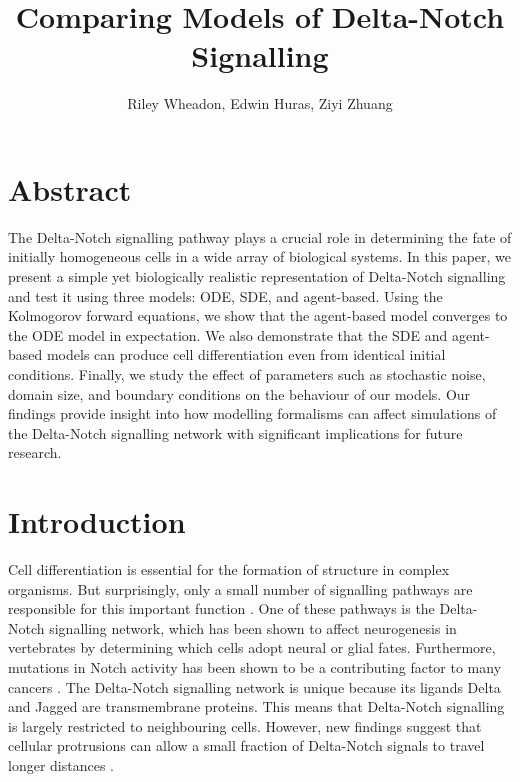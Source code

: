 \documentclass{article}
\title{Comparing Models of Delta-Notch Signalling}
\author{Riley Wheadon, Edwin Huras, Ziyi Zhuang}
\begin{document}
\maketitle

\begin{flushleft}

\section*{Abstract}

The Delta-Notch signalling pathway plays a crucial role in determining the fate of initially homogeneous cells in a wide array of biological systems.
In this paper, we present a simple yet biologically realistic representation of Delta-Notch signalling and test it using three models: ODE, SDE, and agent-based.
Using the Kolmogorov forward equations, we show that the agent-based model converges to the ODE model in expectation.
We also demonstrate that the SDE and agent-based models can produce cell differentiation even from identical initial conditions.
Finally, we study the effect of parameters such as stochastic noise, domain size, and boundary conditions on the behaviour of our models.
Our findings provide insight into how modelling formalisms can affect simulations of the Delta-Notch signalling network with significant implications for future research. 

\section*{Introduction}

Cell differentiation is essential for the formation of structure in complex organisms.
But surprisingly, only a small number of signalling pathways are responsible for this important function \cite{bray_notch_2006}.
One of these pathways is the Delta-Notch signalling network, which has been shown to affect neurogenesis in vertebrates by determining which cells adopt neural or glial fates. 
Furthermore, mutations in Notch activity has been shown to be a contributing factor to many cancers \cite{bray_notch_2006}.
The Delta-Notch signalling network is unique because its ligands Delta and Jagged are transmembrane proteins.
This means that Delta-Notch signalling is largely restricted to neighbouring cells. 
However, new findings suggest that cellular protrusions can allow a small fraction of Delta-Notch signals to travel longer distances \cite{berkemeier_coupling_2023}.

\medskip


\end{flushleft}
\end{document}
